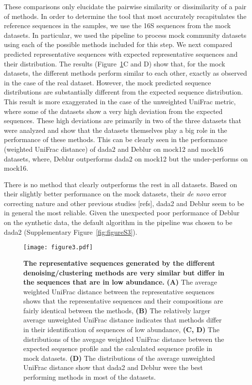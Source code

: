   These comparisons only elucidate the pairwise similarity or dissimilarity of a pair of methods.
  In order to determine the tool that most accurately recapitulates the reference sequences in the samples, we use the 16S sequences from the mock datasets.
  In particular, we used the pipeline to process mock community datasets using each of the possible methods included for this step. We next compared predicted representative sequences with expected representative sequences and their distribution.
  The results (Figure~\ref{fig:figure3}C and D) show that, for the mock datasets, the different methods perform similar to each other, exactly as observed in the case of the real dataset. However, the mock predicted sequence distributions are substantially different from the expected sequence distribution.
  This result is more exaggerated in the case of the unweighted UniFrac metric, where some of the datasets show a very high deviation from the expected sequences.
  These high deviations are primarily in two of the three datasets that were analyzed and show that the datasets themselves play a big role in the performance of these methods.
  This can be clearly seen in the performance (weighted UniFrac distance) of \ac{dada2} and Deblur on mock12 and mock16 datasets, where, Deblur outperforms \ac{dada2} on mock12 but the under-performs on mock16.

  There is no method that clearly outperforms the rest in all datasets.
  Based on their slightly better performance on the mock datasets, their \textit{de novo} error correcting nature and other previous studies [refs], \ac{dada2} and Deblur seem to be in general the most reliable.
  Given the unexpected poor performance of Deblur on the synthetic data, the default algorithm in the pipeline was chosen to be \ac{dada2} (Supplementary Figure~\ref{fig:figureS3}).

  \begin{figure}
    \centering
    \texttt{[image: figure3.pdf]}
    \caption{
      \textbf{The representative sequences generated by the different denoising/clustering methods are very similar but differ in the sequences that are in low abundance.}
      \textbf{(A)} The average weighted UniFrac distance between the representative sequences shows that the representative sequences and their compositions are fairly identical between the methods,
      \textbf{(B)} The relatively larger average unweighted UniFrac distance indicates that methods differ in their identification of sequences of low abundance,
      \textbf{(C, D)} The distributions of the avegage weighted UniFrac distance between the expected sequence profile and the calculated sequence profile in mock datasets.
      \textbf{(D)} The distributions of the average unweighted UniFrac distance show that dada2 and Deblur were the best performing methods in most of the datasets.
    }
    \label{fig:figure3}
  \end{figure}

